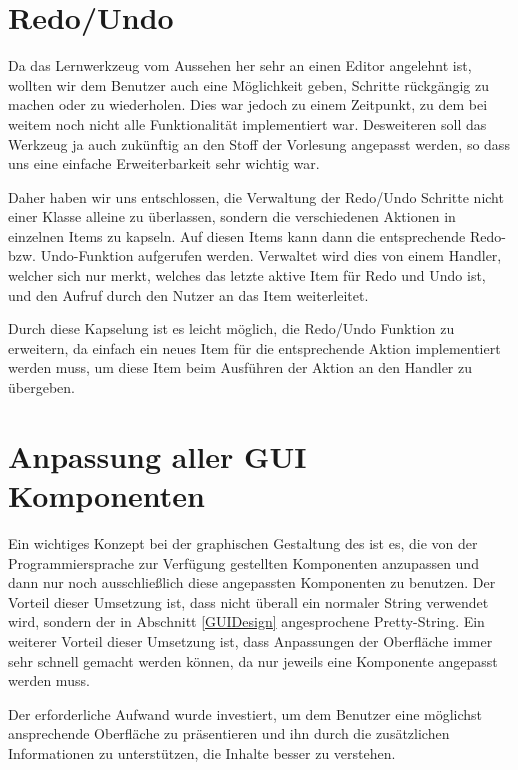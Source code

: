\section{Redo/Undo}\label{GUIRedoUndo}

Da das Lernwerkzeug vom Aussehen her sehr an einen Editor angelehnt ist,
wollten wir dem Benutzer auch eine Möglichkeit geben, Schritte rückgängig zu
machen oder zu wiederholen. Dies war jedoch zu einem Zeitpunkt, zu dem bei
weitem noch nicht alle Funktionalität implementiert war. Desweiteren soll das
Werkzeug ja auch zukünftig an den Stoff der Vorlesung angepasst werden, so dass
uns eine einfache Erweiterbarkeit sehr wichtig war.\vspace{10pt}

Daher haben wir uns entschlossen, die Verwaltung der Redo/Undo Schritte nicht
einer Klasse alleine zu überlassen, sondern die verschiedenen Aktionen in
einzelnen Items zu kapseln. Auf diesen Items kann dann die entsprechende Redo-
bzw. Undo-Funktion aufgerufen werden. Verwaltet wird dies von einem Handler,
welcher sich nur merkt, welches das letzte aktive Item für Redo und Undo ist,
und den Aufruf durch den Nutzer an das Item weiterleitet.\vspace{10pt}

Durch diese Kapselung ist es leicht möglich, die Redo/Undo Funktion zu
erweitern, da einfach ein neues Item für die entsprechende Aktion implementiert
werden muss, um diese Item beim Ausführen der Aktion an den Handler zu
übergeben.\vspace{10pt}


\section{Anpassung aller GUI Komponenten}\label{GUIAdaption}

Ein wichtiges Konzept bei der graphischen Gestaltung des \gtitool ist es, die von
der Programmiersprache zur Verfügung gestellten Komponenten anzupassen und dann
nur noch ausschließlich diese angepassten Komponenten zu benutzen. Der Vorteil
dieser Umsetzung ist, dass nicht überall ein normaler String verwendet wird,
sondern der in Abschnitt \ref{GUIDesign} angesprochene Pretty-String. Ein
weiterer Vorteil dieser Umsetzung ist, dass Anpassungen der Oberfläche immer sehr
schnell gemacht werden können, da nur jeweils eine Komponente angepasst werden
muss.\vspace{10pt}

Der erforderliche Aufwand wurde investiert, um dem Benutzer eine möglichst
ansprechende Oberfläche zu präsentieren und ihn durch die zusätzlichen
Informationen zu unterstützen, die Inhalte besser zu verstehen.\vspace{10pt}

